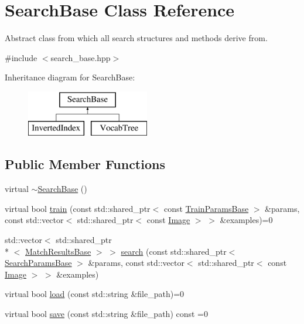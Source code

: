 \hypertarget{classSearchBase}{\section{Search\-Base Class Reference}
\label{classSearchBase}
}


Abstract class from which all search structures and methods derive from.  




{\ttfamily \#include $<$search\-\_\-base.\-hpp$>$}

Inheritance diagram for Search\-Base\-:\begin{figure}[H]
\begin{center}
\leavevmode
\includegraphics[height=2.000000cm]{classSearchBase}
\end{center}
\end{figure}
\subsection*{Public Member Functions}
\begin{DoxyCompactItemize}
\item 
virtual \hyperlink{classSearchBase_aa391cf064522f21c45f211da66882463}{$\sim$\-Search\-Base} ()
\item 
virtual bool \hyperlink{classSearchBase_a83240f56d0981d5eb33cbe9068a79d1e}{train} (const std\-::shared\-\_\-ptr$<$ const \hyperlink{structTrainParamsBase}{Train\-Params\-Base} $>$ \&params, const std\-::vector$<$ std\-::shared\-\_\-ptr$<$ const \hyperlink{classImage}{Image} $>$ $>$ \&examples)=0
\item 
std\-::vector$<$ std\-::shared\-\_\-ptr\\*
$<$ \hyperlink{structMatchResultsBase}{Match\-Results\-Base} $>$ $>$ \hyperlink{classSearchBase_a090a073fa0e68e1b6fbd24def21f9d0c}{search} (const std\-::shared\-\_\-ptr$<$ \hyperlink{structSearchParamsBase}{Search\-Params\-Base} $>$ \&params, const std\-::vector$<$ std\-::shared\-\_\-ptr$<$ const \hyperlink{classImage}{Image} $>$ $>$ \&examples)
\item 
virtual bool \hyperlink{classSearchBase_a8af6d745f82a66b25fcf8cc012ff6e3e}{load} (const std\-::string \&file\-\_\-path)=0
\item 
virtual bool \hyperlink{classSearchBase_ae221617eb05aa616397da75fa1760345}{save} (const std\-::string \&file\-\_\-path) const =0
\end{DoxyCompactItemize}
